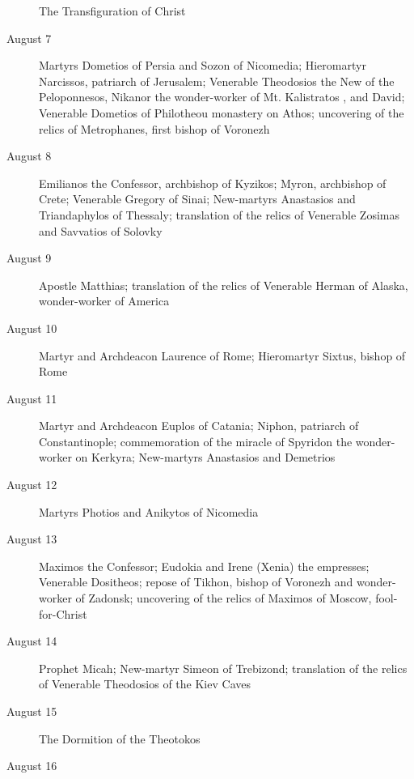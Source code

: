 \begin{description}
The Transfiguration of Christ

\item[August 7]

Martyrs Dometios of Persia and Sozon of Nicomedia; Hieromartyr Narcissos, patriarch of Jerusalem; Venerable Theodosios the New of the Peloponnesos, Nikanor the wonder-worker of Mt. Kalistratos , and David; Venerable Dometios of Philotheou monastery on Athos; uncovering of the relics of Metrophanes, first bishop of Voronezh

\item[August 8]

Emilianos the Confessor, archbishop of Kyzikos; Myron, archbishop of Crete; Venerable Gregory of Sinai; New-martyrs Anastasios and Triandaphylos of Thessaly; translation of the relics of Venerable Zosimas and Savvatios of Solovky

\item[August 9]

Apostle Matthias; translation of the relics of Venerable Herman of Alaska, wonder-worker of America

\item[August 10]

Martyr and Archdeacon Laurence of Rome; Hieromartyr Sixtus, bishop of Rome

\item[August 11]

Martyr and Archdeacon Euplos of Catania; Niphon, patriarch of Constantinople; commemoration of the miracle of Spyridon the wonder-worker on Kerkyra; New-martyrs Anastasios and Demetrios

\item[August 12]

Martyrs Photios and Anikytos of Nicomedia
\item[August 13]

Maximos the Confessor; Eudokia and Irene (Xenia) the empresses; Venerable Dositheos; repose of Tikhon, bishop of Voronezh and wonder-worker of Zadonsk; uncovering of the relics of Maximos of Moscow, fool-for-Christ

\item[August 14]

Prophet Micah; New-martyr Simeon of Trebizond; translation of the relics of Venerable Theodosios of the Kiev Caves

\item[August 15]

The Dormition of the Theotokos
\item[August 16]


\end{description}

